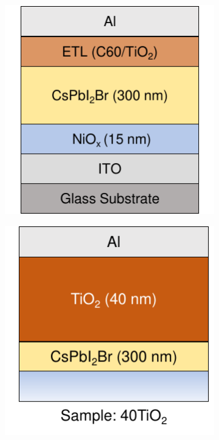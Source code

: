 \begin{figure}[htbp]
    \centering
    \begin{subfigure}{0.24\textwidth}
        \centering
        \includegraphics[width=\textwidth]{chapters/transport_layers/images/ETL_optimization_stack.pdf}
        \caption{}
        \label{}
    \end{subfigure}
    \hfill
    \begin{subfigure}{0.24\textwidth}
        \centering
        \includegraphics[width=\textwidth]{chapters/transport_layers/images/ETL_Optimization_40TiO2.pdf}

\end{subfigure}
\end{figure}
